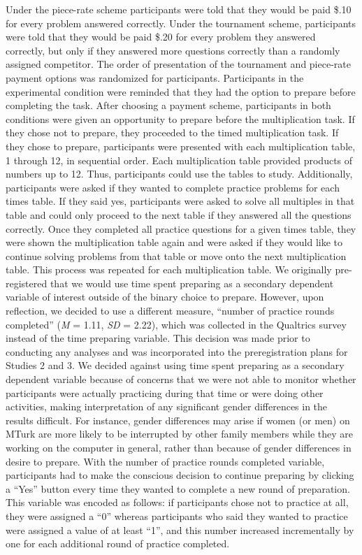 \documentclass[a4paper, nobind]{templates/ociamthesis}
\begin{document}
Under the piece-rate scheme participants were told that they would be paid \$.10 for every problem answered correctly. Under the tournament scheme, participants were told that they would be paid \$.20 for every problem they answered correctly, but only if they answered more questions correctly than a randomly assigned competitor. The order of presentation of the tournament and piece-rate payment options was randomized for participants. Participants in the experimental condition were reminded that they had the option to prepare before completing the task. After choosing a payment scheme, participants in both conditions were given an opportunity to prepare before the multiplication task. If they chose not to prepare, they proceeded to the timed multiplication task. If they chose to prepare, participants were presented with each multiplication table, 1 through 12, in sequential order. Each multiplication table provided products of numbers up to 12. Thus, participants could use the tables to study. Additionally, participants were asked if they wanted to complete practice problems for each times table. If they said yes, participants were asked to solve all multiples in that table and could only proceed to the next table if they answered all the questions correctly. Once they completed all practice questions for a given times table, they were shown the multiplication table again and were asked if they would like to continue solving problems from that table or move onto the next multiplication table. This process was repeated for each multiplication table. We originally pre-registered that we would use time spent preparing as a secondary dependent variable of interest outside of the binary choice to prepare. However, upon reflection, we decided to use a different measure, ``number of practice rounds completed'' (\emph{M} = 1.11, \emph{SD} = 2.22), which was collected in the Qualtrics survey instead of the time preparing variable. This decision was made prior to conducting any analyses and was incorporated into the preregistration plans for Studies 2 and 3. We decided against using time spent preparing as a secondary dependent variable because of concerns that we were not able to monitor whether participants were actually practicing during that time or were doing other activities, making interpretation of any significant gender differences in the results difficult. For instance, gender differences may arise if women (or men) on MTurk are more likely to be interrupted by other family members while they are working on the computer in general, rather than because of gender differences in desire to prepare. With the number of practice rounds completed variable, participants had to make the conscious decision to continue preparing by clicking a ``Yes'' button every time they wanted to complete a new round of preparation. This variable was encoded as follows: if participants chose not to practice at all, they were assigned a ``0'' whereas participants who said they wanted to practice were assigned a value of at least ``1'', and this number increased incrementally by one for each additional round of practice completed.
\end{document}
